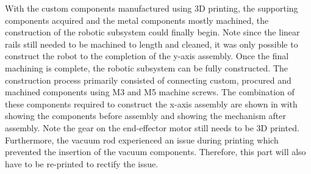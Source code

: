 With the custom components manufactured using 3D printing, the supporting components acquired and the metal components mostly machined, the construction of the robotic subsystem could finally begin. Note since the linear rails still needed to be machined to length and cleaned, it was only possible to construct the robot to the completion of the y-axis assembly. Once the final machining is complete, the robotic subsystem can be fully constructed. The construction process primarily consisted of connecting custom, procured and machined components using M3 and M5 machine screws. The combination of these components required to construct the x-axis assembly are shown in  with  showing the components before assembly and  showing the mechanism after assembly. Note the gear on the end-effector motor still needs to be 3D printed. Furthermore, the vacuum rod experienced an issue during printing which prevented the insertion of the vacuum components. Therefore, this part will also have to be re-printed to rectify the issue.


